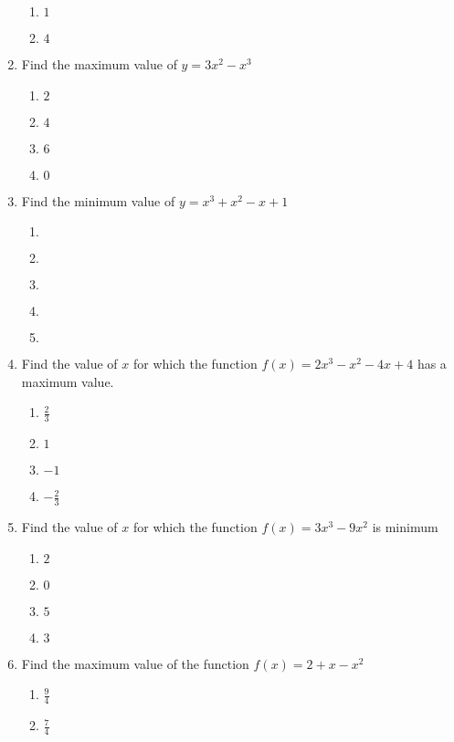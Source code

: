 \begin{multicols}{2}
\begin{enumerate}[label={\arabic*.}]
\begin{enumerate}[label={\Alph*.}]
			\item \(1\)
			\item \(4\)
        \end{enumerate}
  \item Find the maximum value of \(y = 3x^2 - x^3\)
        \begin{enumerate}[label={\Alph*.}]
            \item \(2\)
            \item \(4\)
            \item \(6\)
            \item \(0\)
        \end{enumerate}
  \item Find the minimum value of \(y = x^3 + x^2 - x + 1\)
        \begin{enumerate}[label={\Alph*.}]
            \item \(\)
			\item \(\)
			\item \(\)
			\item \(\)
			\item \(\)
        \end{enumerate}
  \item Find the value of \(x\) for which the function \(f(x) = 2x^3 - x^2 -4x + 4\) has a maximum value.
        \begin{enumerate}[label={\Alph*.}]
            \item \(\frac{2}{3}\)
            \item \(1\)
            \item \(-1\)
            \item \(-\frac{2}{3}\)
        \end{enumerate}
  \item Find the value of \(x\) for which the function \(f(x) = 3x^3-9x^2\) is minimum
        \begin{enumerate}[label={\Alph*.}]
            \item \(2\)
            \item \(0\)
            \item \(5\)
            \item \(3\)
        \end{enumerate}
  \item Find the maximum value of the function \(f(x) = 2 + x - x^2\)
        \begin{enumerate}[label={\Alph*.}]
            \item \(\frac{9}{4}\)
            \item \(\frac{7}{4}\)

\end{enumerate}
\end{enumerate}
\end{multicols}
